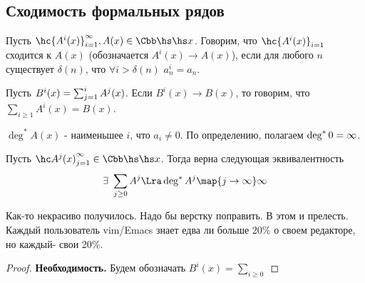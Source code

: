 \documentclass[unicode, 10pt, a4paper, oneside, fleqn]{article}
\begin{document}
\subsection{Сходимость формальных рядов}
\begin{df}
  Пусть $\hc{A^i(x)}_{i=1}^\infty,A(x)\in\Csr$. Говорим, что $\hc{A^i(x)}_{i=1}$ сходится к $A(x)$
  (обозначается $A^i(x)\to A(x)$), если для любого $n$ существует $\delta(n)$, что $\forall i>\delta(n)$
  $a_n^i=a_n$.
\end{df}
\begin{denote}
  Пусть $B^i(x)=\sum_{j=1}^{i}A^j(x)$. Если $B^i(x)\to B(x)$, то 
  говорим, что $\displaystyle\sum_{i\ge1}A^i(x)=B(x)$.
\end{denote}
\begin{denote}
  $\deg^*A(x)$ - наименьшее $i$,  что $a_i\neq 0$. По определению, полагаем $\deg^*0=\infty$.
\end{denote}
\begin{lemma}
  Пусть $\seq{A^j(x)}{1}\in\Csr$. Тогда верна следующая эквивалентность
  \begin{displaymath}
    \exists\ \sum_{j\ge0}A^j\Lra \dega A^j\map{j\to\infty}\infty
  \end{displaymath}
\end{lemma}
\begin{authornote}
Как-то некрасиво получилось. Надо бы верстку поправить. В этом и прелесть. Каждый пользователь
vim/Emacs знает едва ли больше 20\% о своем редакторе, но каждый- свои 20\%.
\end{authornote}
\begin{proof}
  {\bf Необходимость.}
  Будем обозначать $\displaystyle B^i(x)=\sum_{i\ge0}$
  
\end{proof}
\end{document}

